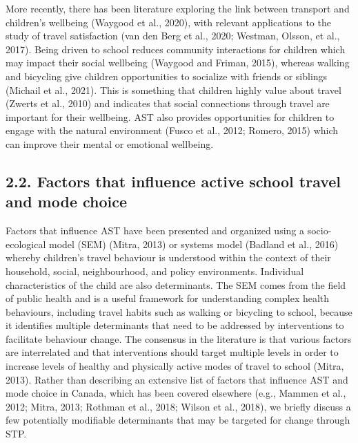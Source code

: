\documentclass[]{elsarticle} %
\begin{document}
More recently, there has been literature exploring the link between
transport and children's wellbeing (Waygood et al., 2020), with relevant
applications to the study of travel satisfaction (van den Berg et al.,
2020; Westman, Olsson, et al., 2017). Being driven to school reduces
community interactions for children which may impact their social
wellbeing (Waygood and Friman, 2015), whereas walking and bicycling give
children opportunities to socialize with friends or siblings (Michail et
al., 2021). This is something that children highly value about travel
(Zwerts et al., 2010) and indicates that social connections through
travel are important for their wellbeing. AST also provides
opportunities for children to engage with the natural environment (Fusco
et al., 2012; Romero, 2015) which can improve their mental or emotional
wellbeing.

\hypertarget{factors-that-influence-active-school-travel-and-mode-choice}{%
\subsection{2.2. Factors that influence active school travel and mode
choice}\label{factors-that-influence-active-school-travel-and-mode-choice}}

Factors that influence AST have been presented and organized using a
socio-ecological model (SEM) (Mitra, 2013) or systems model (Badland et
al., 2016) whereby children's travel behaviour is understood within the
context of their household, social, neighbourhood, and policy
environments. Individual characteristics of the child are also
determinants. The SEM comes from the field of public health and is a
useful framework for understanding complex health behaviours, including
travel habits such as walking or bicycling to school, because it
identifies multiple determinants that need to be addressed by
interventions to facilitate behaviour change. The consensus in the
literature is that various factors are interrelated and that
interventions should target multiple levels in order to increase levels
of healthy and physically active modes of travel to school (Mitra,
2013). Rather than describing an extensive list of factors that
influence AST and mode choice in Canada, which has been covered
elsewhere (e.g., Mammen et al., 2012; Mitra, 2013; Rothman et al., 2018;
Wilson et al., 2018), we briefly discuss a few potentially modifiable
determinants that may be targeted for change through STP.
\end{document}

